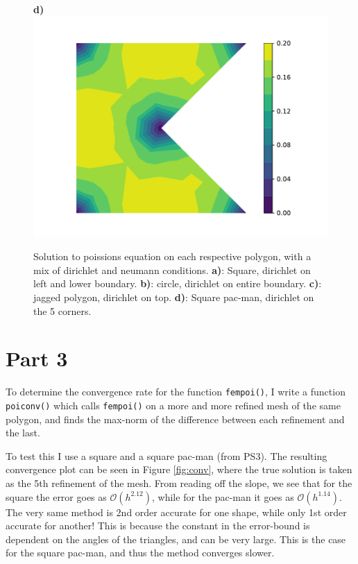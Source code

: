 \documentclass[aps, 12pt]{revtex4}
\begin{document}
\begin{figure}
    \endminipage\hfill
    \textbf{d)}
    \includegraphics[width=\linewidth]{nepal.pdf}
    \endminipage\hfill
    \caption{Solution to poissions equation on each respective polygon, with a mix of dirichlet and neumann conditions. \textbf{a)}: Square, dirichlet on left and lower boundary. \textbf{b)}: circle, dirichlet on entire boundary. \textbf{c)}: jagged polygon, dirichlet on top. \textbf{d)}: Square pac-man, dirichlet on the 5 corners.}
    \label{fig:possions}
\end{figure}

\section*{Part 3}
To determine the convergence rate for the function \texttt{fempoi()}, I write a function \texttt{poiconv()} which calls \texttt{fempoi()} on a more and more refined mesh of the same polygon, and finds the max-norm of the difference between each refinement and the last.

To test this I use a square and a square pac-man (from PS3). The resulting convergence plot can be seen in Figure \ref{fig:conv}, where the true solution is taken as the 5th refinement of the mesh. From reading off the slope, we see that for the square the error goes as $\mathcal{O}(h^{2.12})$, while for the pac-man it goes as $\mathcal{O}(h^{1.14})$. The very same method is 2nd order accurate for one shape, while only 1st order accurate for another! This is because the constant in the error-bound is dependent on the angles of the triangles, and can be very large. This is the case for the square pac-man, and thus the method converges slower.
\end{document}

